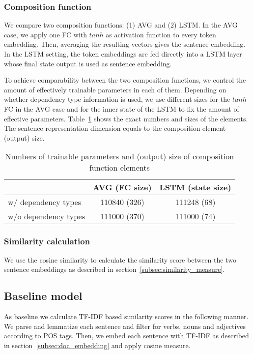 \subsubsection{Composition function}
We compare two composition functions: (1) \acf{AVG} and (2) \acf{LSTM}. 
In the \ac{AVG} case, we apply one \acf{FC} with $tanh$ as activation function to every token embedding. Then, averaging the resulting vectors gives the sentence embedding.
In the \ac{LSTM} setting, the token embeddings are fed directly into a LSTM layer whose final state  output is used as sentence embedding. %

To achieve comparability between the two composition functions, we control the amount of effectively trainable parameters in each of them. Depending on whether dependency type information is used, we use different sizes for the $tanh$ \ac{FC} in the \ac{AVG} case and for the inner state of the \ac{LSTM} to fix the amount of effective parameters. Table~\ref{tab:sizes} shows the exact numbers and sizes of the elements. The sentence representation dimension equals to the composition element (output) size.  %

\begin{table}[!htb]
  \centering
  \begin{tabular}{ l | c | c }
      & AVG (FC size) & LSTM (state size) \\ \hline
    w/ dependency types & 110840 (326) & 111248 (68) \\ 
    w/o dependency types & 111000 (370) & 111000 (74) \\
  \end{tabular}
  \caption{Numbers of trainable parameters and (output) size of composition function elements}
  \label{tab:sizes}
\end{table}

\subsubsection{Similarity calculation}
We use the cosine similarity to calculate the similarity score between the two sentence embeddings as described in section~\ref{subsec:similarity_measure}.

\subsection{Baseline model}
As baseline we calculate TF-IDF based similarity scores in the following manner. We parse and lemmatize each sentence and filter for verbs, nouns and adjectives according to POS tags. Then, we embed each sentence with TF-IDF as described in section~\ref{subsec:doc_embedding} and apply cosine measure. 

